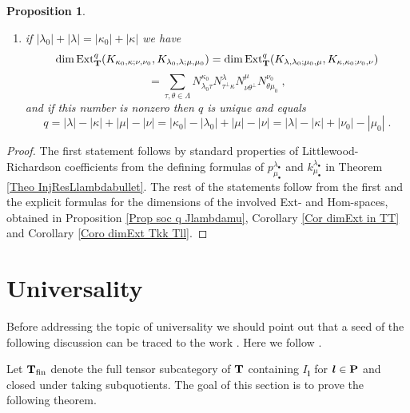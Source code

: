 \documentclass[12pt]{article}
\newtheorem{prop}[theorem]{Proposition}
\begin{document}
\begin{prop}
\begin{enumerate}
$$$$
and if this number is nonzero then $q$ is unique and equals
$$
q=|\kappa_0|-|\lambda_0| + |\mu|-|\nu| = |\lambda|-|\kappa| + |\nu_0|-|\mu_0|\;;
$$
\item if $|\lambda_0|+|\lambda|=|\kappa_0|+|\kappa|$ we have
$$
\dim{\rm Ext}^q_{\bf T}(K_{\kappa_0,\kappa;\nu,\nu_0},K_{\lambda_0,\lambda;\mu,\mu_0}) = \dim{\rm Ext}^q_{\bf T}(K_{\lambda,\lambda_0;\mu_0,\mu},K_{\kappa,\kappa_0;\nu_0,\nu})
$$
$$
= \sum\limits_{\tau,\theta\in\Lambda} N^{\kappa_0}_{\lambda_0\tau} N^{\lambda}_{\tau^\perp\kappa} N^{\mu}_{\nu\theta^\perp} N^{\nu_0}_{\theta\mu_0} \;,
$$
and if this number is nonzero then $q$ is unique and equals
$$
q=|\lambda|-|\kappa|+|\mu|-|\nu|=|\kappa_0|-|\lambda_0| + |\mu|-|\nu| = |\lambda|-|\kappa| + |\nu_0|-|\mu_0|\;.
$$
\end{enumerate}
\end{prop}


\begin{proof}
The first statement follows by standard properties of Littlewood-Richardson coefficients from the defining formulas of $p^{\lambda_\bullet}_{\mu_\bullet}$ and $k^{\lambda_\bullet}_{\mu_\bullet}$ in Theorem \ref{Theo InjResLlambdabullet}. The rest of the statements follow from the first and the explicit formulas for the dimensions of the involved Ext- and Hom-spaces, obtained in Proposition \ref{Prop soc q Jlambdamu}, Corollary \ref{Cor dimExt in TT} and Corollary \ref{Coro dimExt Tkk Tll}.
\end{proof}




\section{Universality}\label{Sec Univ}

Before addressing the topic of universality we should point out that a seed of the following discussion can be traced to the work \cite{Sam-Snowden}. Here we follow \cite{Chirvasitu-Penkov-UTC}.

Let ${\bf T}_{\rm fin}$ denote the full tensor subcategory of ${\bf T}$ containing $I_{\bm l}$ for $\bm l\in{\bf P}$ and closed under taking subquotients. The goal of this section is to prove the following theorem.
\end{document}
